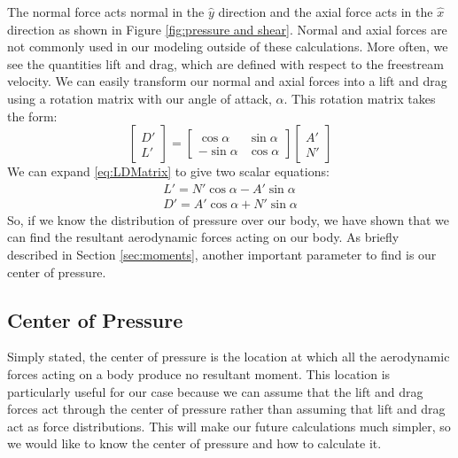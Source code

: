 \documentclass[12pt]{report}
\begin{document}
The normal force acts normal in the $\hat{y}$ direction and the axial force acts in the $\hat {x}$ direction as shown in Figure \ref{fig:pressure and shear}. Normal and axial forces are not commonly used in our modeling outside of these calculations. More often, we see the quantities lift and drag, which are defined with respect to the \gls{freestream} velocity. We can easily transform our normal and axial forces into a lift and drag using a rotation matrix with our \gls{angle of attack}, $\alpha$. This rotation matrix takes the form:
\begin{equation}\label{eq:LDMatrix}
 \begin{bmatrix}
     D'\\L'
 \end{bmatrix}
 =\begin{bmatrix}
        \cos\alpha &\sin\alpha\\
        -\sin\alpha&\cos\alpha
    \end{bmatrix}
    \begin{bmatrix}
        A'\\N'
    \end{bmatrix}
\end{equation}
We can expand \eqref{eq:LDMatrix} to give two scalar equations:
\begin{gather}
        L'=N'\cos\alpha-A'\sin\alpha\\
        D'=A'\cos\alpha+N'\sin\alpha
\end{gather}
So, if we know the distribution of pressure over our body, we have shown that we can find the resultant aerodynamic forces acting on our body. As briefly described in Section \ref{sec:moments}, another important parameter to find is our center of pressure.
\subsection{Center of Pressure}
Simply stated, the center of pressure is the location at which all the aerodynamic forces acting on a body produce no resultant moment. This location is particularly useful for our case because we can assume that the lift and drag forces act through the center of pressure rather than assuming that lift and drag act as force distributions. This will make our future calculations much simpler, so we would like to know the center of pressure and how to calculate it.
\end{document}
